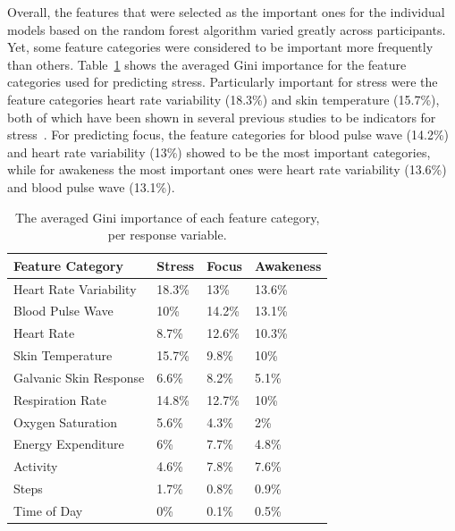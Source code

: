 Overall, the features that were selected as the important ones for the individual models based on the random forest algorithm varied greatly across participants. Yet, some feature categories were considered to be important more frequently than others. Table~\ref{tab:featureImportance} shows the averaged Gini importance for the feature categories used for predicting stress. Particularly important for stress were the feature categories heart rate variability (18.3\%) and skin temperature (15.7\%), both of which have been shown in several previous studies to be  indicators for stress~\cite{dishman2000stress,mcduff16,kataoka00}. For predicting focus, the feature categories for blood pulse wave (14.2\%) and heart rate variability (13\%) showed to be the most important categories, while for awakeness the most important ones were heart rate variability (13.6\%) and blood pulse wave (13.1\%).\\[-0.1cm]


\begin{table}[h!]
  \begin{centering}
  \begin{tabular}{llll}
    \hline
    Feature Category & Stress & Focus & Awakeness\\
    \hline
    Heart Rate Variability & 18.3\% & 13\% & 13.6\%\\
    Blood Pulse Wave & 10\% & 14.2\% & 13.1\%\\
    Heart Rate & 8.7\% & 12.6\% & 10.3\%\\
    Skin Temperature & 15.7\% & 9.8\% & 10\%\\
    Galvanic Skin Response & 6.6\% & 8.2\% & 5.1\%\\
    Respiration Rate & 14.8\% & 12.7\% & 10\%\\
    Oxygen Saturation & 5.6\% & 4.3\% & 2\%\\ 
    Energy Expenditure & 6\% & 7.7\% & 4.8\%\\
    Activity & 4.6\% & 7.8\% & 7.6\%\\
    Steps & 1.7\% & 0.8\% & 0.9\%\\
    Time of Day & 0\% & 0.1\% & 0.5\%\\
    \hline
  \end{tabular}
  \caption{The averaged Gini importance of each feature category, per response variable.}
  \label{tab:featureImportance}
  \end{centering}
  \vspace*{-2mm}
\end{table}

